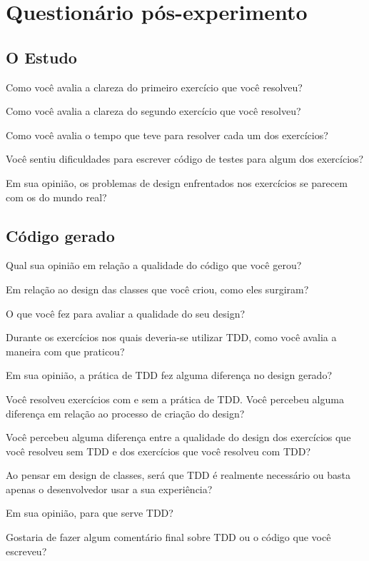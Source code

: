\chapter{Questionário pós-experimento}
\label{ape:questionario-pos}

\section{O Estudo}

Como você avalia a clareza do primeiro exercício que você resolveu?	

Como você avalia a clareza do segundo exercício que você resolveu?	

Como você avalia o tempo que teve para resolver cada um dos exercícios?	

Você sentiu dificuldades para escrever código de testes para algum dos exercícios?	

Em sua opinião, os problemas de design enfrentados nos exercícios se parecem com os do mundo real?

\section{Código gerado}
Qual sua opinião em relação a qualidade do código que você gerou?	

Em relação ao design das classes que você criou, como eles surgiram?

O que você fez para avaliar a qualidade do seu design?	


Durante os exercícios nos quais deveria-se utilizar TDD, como você avalia a maneira com que praticou?	

Em sua opinião, a prática de TDD fez alguma diferença no design gerado?	

Você resolveu exercícios com e sem a prática de TDD. Você percebeu alguma diferença em relação ao processo de criação do design?	

Você percebeu alguma diferença entre a qualidade do design dos exercícios que você resolveu sem TDD e dos exercícios que você resolveu com TDD?	

Ao pensar em design de classes, será que TDD é realmente necessário ou basta apenas o desenvolvedor usar a sua experiência?	

Em sua opinião, para que serve TDD?	

Gostaria de fazer algum comentário final sobre TDD ou o código que você escreveu?	
